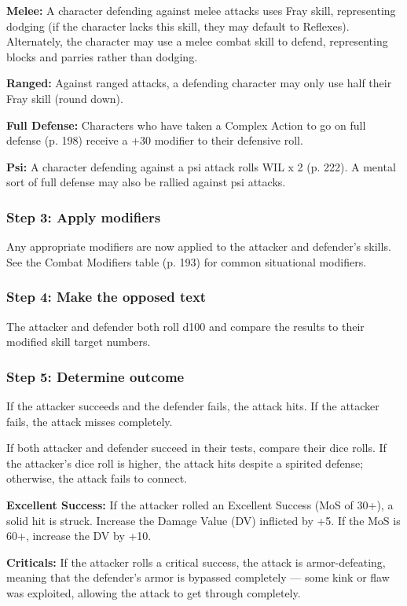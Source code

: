 \textbf{Melee:} A character defending against melee attacks uses Fray skill, representing dodging (if the character lacks this skill, they may default to Reflexes). Alternately, the character may use a melee combat skill to defend, representing blocks and parries rather than dodging.

\textbf{Ranged:} Against ranged attacks, a defending character may only use half their Fray skill (round down).

\textbf{Full Defense:} Characters who have taken a Complex Action to go on full defense (p. 198) receive a +30 modifier to their defensive roll.

\textbf{Psi:} A character defending against a psi attack rolls WIL x 2 (p. 222). A mental sort of full defense may also be rallied against psi attacks.

\subsubsection{Step 3: Apply modifiers} Any appropriate modifiers are now applied to the attacker and defender’s skills. See the Combat Modifiers table (p. 193) for common situational modifiers.

\subsubsection{Step 4: Make the opposed text} The attacker and defender both roll d100 and compare the results to their modified skill target numbers.

\subsubsection{Step 5: Determine outcome} If the attacker succeeds and the defender fails, the attack hits. If the attacker fails, the attack misses completely.

If both attacker and defender succeed in their tests, compare their dice rolls. If the attacker’s dice roll is higher, the attack hits despite a spirited defense; otherwise, the attack fails to connect.

\textbf{Excellent Success:} If the attacker rolled an Excellent Success (MoS of 30+), a solid hit is struck. Increase the Damage Value (DV) inflicted by +5. If the MoS is 60+, increase the DV by +10.

\textbf{Criticals:} If the attacker rolls a critical success, the attack is armor-defeating, meaning that the defender’s armor is bypassed completely — some kink or flaw was exploited, allowing the attack to get through completely.

